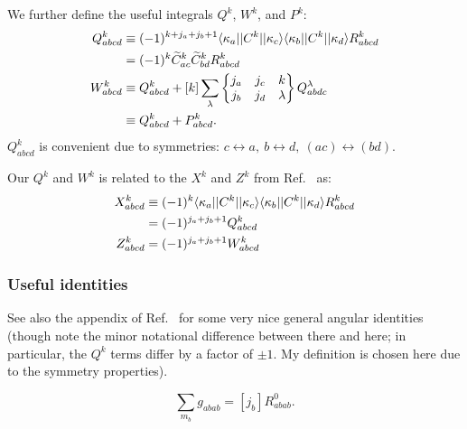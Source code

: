 \documentclass[10pt,twocolumn,a4paper]{article}%
\newcommand{\bra}[1]{\ensuremath{\langle #1|}}	%
\newcommand{\ket}[1]{\ensuremath{|#1\rangle}}	%
\newcommand{\threej}[6]{\ensuremath{\begin{pmatrix}#1&#2&#3\\#4&#5&#6\end{pmatrix}}}	%
\newcommand{\sixj}[6]{\ensuremath{\begin{Bmatrix}#1&#2&#3\\#4&#5&#6\end{Bmatrix}}}	%
\newcommand{\be}{\begin{equation}}
\newcommand{\ee}{\end{equation}}
\renewcommand{\k}{\ensuremath{\kappa}}
\begin{document}
We further define the useful integrals $Q^k$, $W^k$, and $P^k$:
\begin{align}
Q^k_{abcd} &\equiv  (-1)^{k + j_a+j_b+1}\bra{\k_a}|C^k|\ket{\k_c} \bra{\k_b}|C^k|\ket{\k_d} R^k_{abcd} \notag\\
&= (-1)^k \widetilde C^k_{ac}\widetilde C^k_{bd}R^k_{abcd}\\
W^k_{abcd} &\equiv Q^k_{abcd} + [k] \sum_\lambda \sixj{j_a}{j_c}{k}{j_b}{j_d}{\lambda}Q^\lambda_{abdc} \notag\\
& \equiv Q^k_{abcd}  + P^k_{abcd}.
\end{align}
$Q^k_{abcd}$  is convenient due to symmetries: $c\leftrightarrow a ,~ b\leftrightarrow d  ,~ (ac)\leftrightarrow (bd)$.%


Our $Q^k$ and $W^k$ is related to the $X^k$ and $Z^k$ from Ref.~\cite{Lindgren1986} as:
\begin{align}
X^k_{abcd} &\equiv  (-1)^k \bra{\k_a}|C^k|\ket{\k_c} \bra{\k_b}|C^k|\ket{\k_d} R^k_{abcd} \notag\\
 & = (-1)^{j_a+j_b+1}Q^k_{abcd}\\
 Z^k_{abcd} &=  (-1)^{j_a+j_b+1} W^k_{abcd}
\end{align}


\subsubsection*{Useful identities}


See also the appendix of Ref.~\cite{DzubaHFS1984} for some very nice general angular identities (though note the minor notational difference between there and here; in particular, the $Q^k$ terms differ by a factor of $\pm1$. My definition is chosen here due to the symmetry properties).

\be
\sum_{m_b}g_{abab} = [j_b] R^0_{abab}.
\ee


\end{document}
